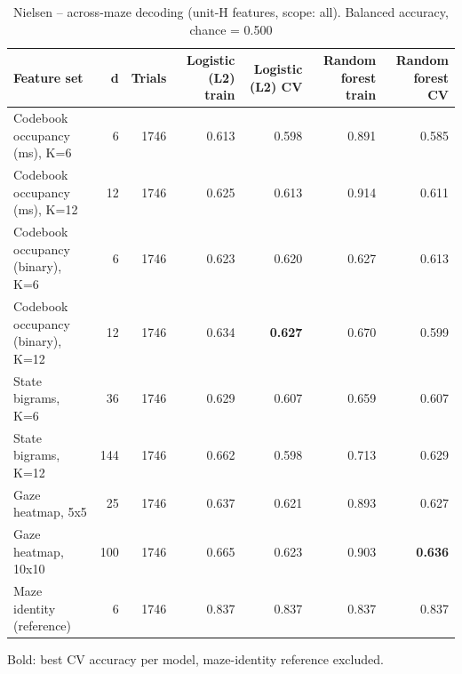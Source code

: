 \begin{table}[t]
\centering
\caption{Nielsen -- across-maze decoding (unit-H features, scope: all). Balanced accuracy, chance = 0.500}
\label{tab:crossmaze_Nielsen}
\begin{tabular}{lrrrrrr}
\toprule
Feature set & d & Trials & Logistic (L2) train & Logistic (L2) CV & Random forest train & Random forest CV \\
\midrule
Codebook occupancy (ms), K=6 & 6 & 1746 & 0.613 & 0.598 & 0.891 & 0.585 \\
Codebook occupancy (ms), K=12 & 12 & 1746 & 0.625 & 0.613 & 0.914 & 0.611 \\
Codebook occupancy (binary), K=6 & 6 & 1746 & 0.623 & 0.620 & 0.627 & 0.613 \\
Codebook occupancy (binary), K=12 & 12 & 1746 & 0.634 & \textbf{0.627} & 0.670 & 0.599 \\
State bigrams, K=6 & 36 & 1746 & 0.629 & 0.607 & 0.659 & 0.607 \\
State bigrams, K=12 & 144 & 1746 & 0.662 & 0.598 & 0.713 & 0.629 \\
Gaze heatmap, 5x5 & 25 & 1746 & 0.637 & 0.621 & 0.893 & 0.627 \\
Gaze heatmap, 10x10 & 100 & 1746 & 0.665 & 0.623 & 0.903 & \textbf{0.636} \\
Maze identity (reference) & 6 & 1746 & 0.837 & 0.837 & 0.837 & 0.837 \\
\bottomrule
\end{tabular}
\par\smallskip
{\footnotesize Bold: best CV accuracy per model, maze-identity reference excluded.}
\end{table}
